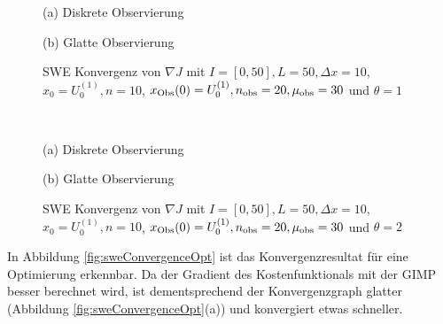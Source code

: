 \begin{figure}[H]
\footnotesize
\begin{minipage}[b]{0.49\linewidth}
\centering

\caption*{(a) Diskrete Observierung}
\end{minipage}
\begin{minipage}[b]{0.49\linewidth}
\centering

\caption*{(b) Glatte Observierung}
\end{minipage}
\caption{SWE Konvergenz von $\nabla J$ mit $I=[0,50],L=50,\Delta x=10$, $x_0=U_0^{(1)},n=10$, $x_{\text{Obs}}(0) = U_0^{(1)}, n_{\text{obs}}=20,\mu_{\text{obs}}=30$ und $\theta=1$}
\label{fig:sweConvergenceAdjoint}
% 
\quad\\[0.3cm]
\begin{minipage}[b]{0.49\linewidth}
\centering

% 
\caption*{(a) Diskrete Observierung}
\end{minipage}
\begin{minipage}[b]{0.49\linewidth}
\centering

% 
\caption*{(b) Glatte Observierung}
\end{minipage}
\caption{SWE Konvergenz von $\nabla J$ mit $I=[0,50],L=50,\Delta x=10$, $x_0=U_0^{(1)},n=10$, $x_{\text{Obs}}(0) = U_0^{(1)}, n_{\text{obs}}=20,\mu_{\text{obs}}=30$ und $\theta=2$}
\label{fig:sweConvergenceAdjoint1}
\end{figure}


In Abbildung \ref{fig:sweConvergenceOpt} ist das Konvergenzresultat für eine Optimierung erkennbar.
Da der Gradient des Kostenfunktionals mit der GIMP besser berechnet wird, ist dementsprechend der Konvergenzgraph glatter (Abbildung \ref{fig:sweConvergenceOpt}(a)) und konvergiert etwas schneller.


